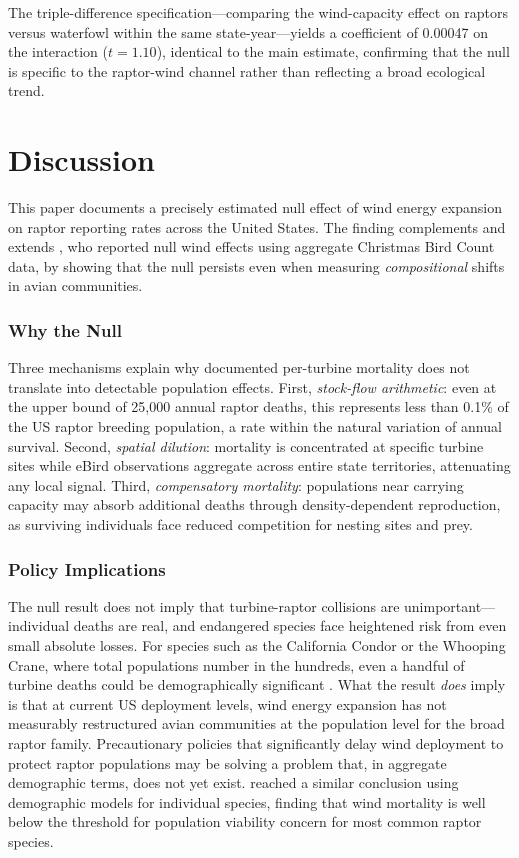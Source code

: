 \documentclass[12pt]{article}
\begin{document}
The triple-difference specification---comparing the wind-capacity effect on raptors versus waterfowl within the same state-year---yields a coefficient of 0.00047 on the interaction ($t = 1.10$), identical to the main estimate, confirming that the null is specific to the raptor-wind channel rather than reflecting a broad ecological trend.

\section{Discussion}

This paper documents a precisely estimated null effect of wind energy expansion on raptor reporting rates across the United States. The finding complements and extends \citet{katovich2024environmental}, who reported null wind effects using aggregate Christmas Bird Count data, by showing that the null persists even when measuring \textit{compositional} shifts in avian communities.

\subsubsection*{Why the Null} Three mechanisms explain why documented per-turbine mortality does not translate into detectable population effects. First, \textit{stock-flow arithmetic}: even at the upper bound of 25,000 annual raptor deaths, this represents less than 0.1\% of the US raptor breeding population, a rate within the natural variation of annual survival. Second, \textit{spatial dilution}: mortality is concentrated at specific turbine sites while eBird observations aggregate across entire state territories, attenuating any local signal. Third, \textit{compensatory mortality}: populations near carrying capacity may absorb additional deaths through density-dependent reproduction, as surviving individuals face reduced competition for nesting sites and prey.

\subsubsection*{Policy Implications} The null result does not imply that turbine-raptor collisions are unimportant---individual deaths are real, and endangered species face heightened risk from even small absolute losses. For species such as the California Condor or the Whooping Crane, where total populations number in the hundreds, even a handful of turbine deaths could be demographically significant \citep{marques2014understanding}. What the result \textit{does} imply is that at current US deployment levels, wind energy expansion has not measurably restructured avian communities at the population level for the broad raptor family. Precautionary policies that significantly delay wind deployment to protect raptor populations may be solving a problem that, in aggregate demographic terms, does not yet exist. \citet{diffendorfer2019demographic} reached a similar conclusion using demographic models for individual species, finding that wind mortality is well below the threshold for population viability concern for most common raptor species.
\end{document}
